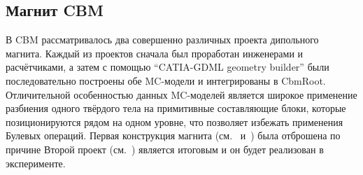 
\subsection{Магнит CBM}\label{sec:secCbmMagnet}

В CBM рассматривалось два совершенно различных проекта дипольного магнита. Каждый из проектов сначала был проработан инженерами и расчётчиками, а затем с помощью ``CATIA-GDML geometry builder'' были последовательно построены обе MC-модели и интегрированы в CbmRoot.
Отличительной особенностью данных MC-моделей является широкое применение разбиения одного твёрдого тела на примитивные составляющие блоки, которые позиционируются рядом на одном уровне, что позволяет избежать применения Булевых операций.
Первая конструкция магнита (см.~ и~) была отброшена по причине \todo
Второй проект (см.~) является итоговым и он будет реализован в эксперименте.

